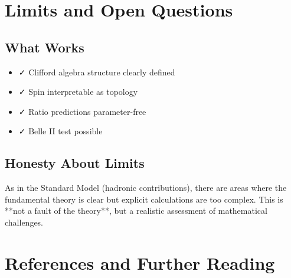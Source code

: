 	\section{Limits and Open Questions}
	
	\subsection{What Works}
	
	\begin{itemize}
		\item ✓ Clifford algebra structure clearly defined
		\item ✓ Spin interpretable as topology
		\item ✓ Ratio predictions parameter-free
		\item ✓ Belle II test possible
	\end{itemize}

	\subsection{Honesty About Limits}
	
	As in the Standard Model (hadronic contributions), there are areas where the fundamental 
	theory is clear but explicit calculations are too complex. This is **not a fault of the 
	theory**, but a realistic assessment of mathematical challenges.
	
	\section*{References and Further Reading}
	
